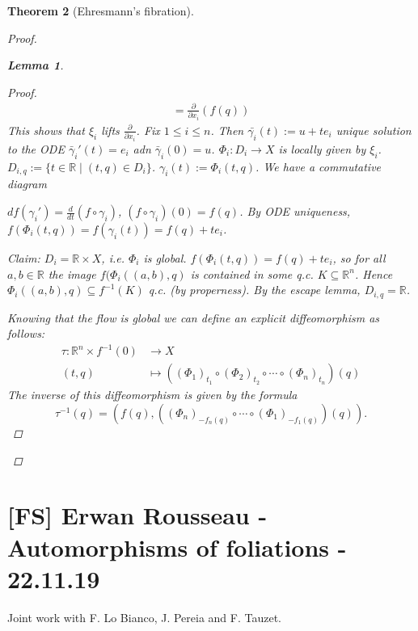 \documentclass[12pt]{article}
\theoremstyle{darkgreentheorem}
\newtheorem{thm}{Theorem}[section]
\newtheorem{lm}[thm]{Lemma}
\theoremstyle{darkbluedefinition}
\theoremstyle{darkredexample}
\theoremstyle{remark}
\newcommand{\R}{\mathbb{R}}
\newcommand{\1}{\mathbbm{1}}
\newcommand{\tms}{\times}
\newcommand{\sub}{\subseteq}
\begin{document}
\begin{thm}[Ehresmann's fibration]
\begin{proof}
\begin{lm}
\begin{proof}
\begin{multline*}
		    =\frac{\partial}{\partial x_{i}}(f(q))
		\end{multline*}
		This shows that $\xi_{i}$ lifts $\frac{\partial}{\partial x_{i}}$.
		Fix $1\leqslant i\leqslant n$.
		Then $\bar{\gamma_{i}}(t):=u+te_{i}$ unique solution to the ODE $\bar{\gamma}_{i}'(t)=e_{i}$ adn $\bar{\gamma}_{i}(0)=u$.
		$\Phi_{i}\colon D_{i}\to X$ is locally given by $\xi_{i}$.
		$D_{i,q}:=\{t\in \R\mid (t,q)\in D_{i}\}$.
		$\gamma_{i}(t):=\Phi_{i}(t,q)$.
		We have a commutative diagram
		\begin{center}
		\end{center}
		$df(\gamma_{i}')=\frac{d}{dt}(f\circ \gamma_{i})$, $(f\circ \gamma_{i})(0)=f(q)$.
		By ODE uniqueness, $f(\Phi_{i}(t,q))=f(\gamma_{i}(t))=f(q)+te_{i}$.

		Claim: $D_{i}=\R\tms X$, i.e. $\Phi_{i}$ is global.
		$f(\Phi_{i}(t,q))=f(q)+te_{i}$, so for all $a,b\in \R$ the image $f(\Phi_{i}((a,b),q)$ is contained in some q.c. $K\sub \R^{n}$.
		Hence $\Phi_{i}((a,b),q)\sub f^{-1}(K)$ q.c. (by properness).
		By the escape lemma, $D_{i,q}=\R$.
		
		Knowing that the flow is global we can define an explicit diffeomorphism as follows:
		\begin{align*}
		    \tau\colon \R^{n}\tms f^{-1}(0) & \longrightarrow X \\
		    (t,q) &\longmapsto ((\Phi_{1})_{t_{1}}\circ (\Phi_{2})_{t_{2}}\circ \cdots \circ (\Phi_{n})_{t_{n}})(q)
		\end{align*}
		The inverse of this diffeomorphism is given by the formula
		\[ \tau^{-1}(q)=(f(q),((\Phi_{n})_{-f_{n}(q)}\circ \cdots \circ (\Phi_{1})_{-f_{1}(q)})(q)). \]
	    \end{proof}
	\end{lm}
    \end{proof}
\end{thm}

\section{[FS] Erwan Rousseau - Automorphisms of foliations - 22.11.19}

Joint work with F. Lo Bianco, J. Pereia and F. Tauzet.
\end{document}
